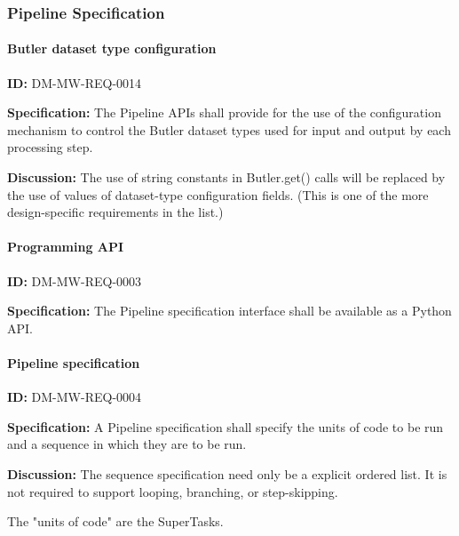 \documentclass[SE,toc,lsstdraft]{lsstdoc}
\begin{document}
\subsubsection{Pipeline Specification}





\paragraph{Butler dataset type configuration}\hfill  %

\label{DM-MW-REQ-0014}
\textbf{ID:} DM-MW-REQ-0014

\textbf{Specification:}
The Pipeline APIs shall provide for the use of the configuration mechanism to control the Butler dataset types used for input and output by each processing step.

\textbf{Discussion:}
The use of string constants in Butler.get() calls will be replaced by the use of values of dataset-type configuration fields. (This is one of the more design-specific requirements in the list.)




\paragraph{Programming API}\hfill  %

\label{DM-MW-REQ-0003}
\textbf{ID:} DM-MW-REQ-0003

\textbf{Specification:}
The Pipeline specification interface shall be available as a Python API.





\paragraph{Pipeline specification}\hfill  %

\label{DM-MW-REQ-0004}
\textbf{ID:} DM-MW-REQ-0004

\textbf{Specification:}
A Pipeline specification shall specify the units of code to be run and a sequence in which they are to be run.

\textbf{Discussion:}
The sequence specification need only be a explicit ordered list.  It is not required to support looping, branching, or step-skipping.

The "units of code" are the SuperTasks.
\end{document}
